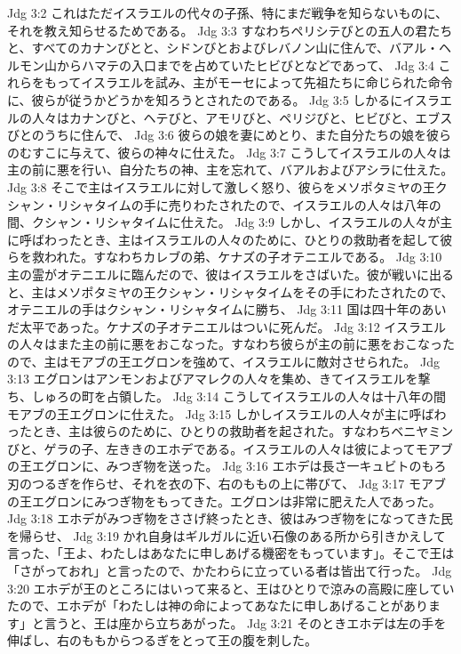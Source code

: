 Jdg 3:2  これはただイスラエルの代々の子孫、特にまだ戦争を知らないものに、それを教え知らせるためである。
Jdg 3:3  すなわちペリシテびとの五人の君たちと、すべてのカナンびとと、シドンびとおよびレバノン山に住んで、バアル・ヘルモン山からハマテの入口までを占めていたヒビびとなどであって、
Jdg 3:4  これらをもってイスラエルを試み、主がモーセによって先祖たちに命じられた命令に、彼らが従うかどうかを知ろうとされたのである。
Jdg 3:5  しかるにイスラエルの人々はカナンびと、ヘテびと、アモリびと、ペリジびと、ヒビびと、エブスびとのうちに住んで、
Jdg 3:6  彼らの娘を妻にめとり、また自分たちの娘を彼らのむすこに与えて、彼らの神々に仕えた。
Jdg 3:7  こうしてイスラエルの人々は主の前に悪を行い、自分たちの神、主を忘れて、バアルおよびアシラに仕えた。
Jdg 3:8  そこで主はイスラエルに対して激しく怒り、彼らをメソポタミヤの王クシャン・リシャタイムの手に売りわたされたので、イスラエルの人々は八年の間、クシャン・リシャタイムに仕えた。
Jdg 3:9  しかし、イスラエルの人々が主に呼ばわったとき、主はイスラエルの人々のために、ひとりの救助者を起して彼らを救われた。すなわちカレブの弟、ケナズの子オテニエルである。
Jdg 3:10  主の霊がオテニエルに臨んだので、彼はイスラエルをさばいた。彼が戦いに出ると、主はメソポタミヤの王クシャン・リシャタイムをその手にわたされたので、オテニエルの手はクシャン・リシャタイムに勝ち、
Jdg 3:11  国は四十年のあいだ太平であった。ケナズの子オテニエルはついに死んだ。
Jdg 3:12  イスラエルの人々はまた主の前に悪をおこなった。すなわち彼らが主の前に悪をおこなったので、主はモアブの王エグロンを強めて、イスラエルに敵対させられた。
Jdg 3:13  エグロンはアンモンおよびアマレクの人々を集め、きてイスラエルを撃ち、しゅろの町を占領した。
Jdg 3:14  こうしてイスラエルの人々は十八年の間モアブの王エグロンに仕えた。
Jdg 3:15  しかしイスラエルの人々が主に呼ばわったとき、主は彼らのために、ひとりの救助者を起された。すなわちベニヤミンびと、ゲラの子、左ききのエホデである。イスラエルの人々は彼によってモアブの王エグロンに、みつぎ物を送った。
Jdg 3:16  エホデは長さ一キュビトのもろ刃のつるぎを作らせ、それを衣の下、右のももの上に帯びて、
Jdg 3:17  モアブの王エグロンにみつぎ物をもってきた。エグロンは非常に肥えた人であった。
Jdg 3:18  エホデがみつぎ物をささげ終ったとき、彼はみつぎ物をになってきた民を帰らせ、
Jdg 3:19  かれ自身はギルガルに近い石像のある所から引きかえして言った、「王よ、わたしはあなたに申しあげる機密をもっています」。そこで王は「さがっておれ」と言ったので、かたわらに立っている者は皆出て行った。
Jdg 3:20  エホデが王のところにはいって来ると、王はひとりで涼みの高殿に座していたので、エホデが「わたしは神の命によってあなたに申しあげることがあります」と言うと、王は座から立ちあがった。
Jdg 3:21  そのときエホデは左の手を伸ばし、右のももからつるぎをとって王の腹を刺した。
